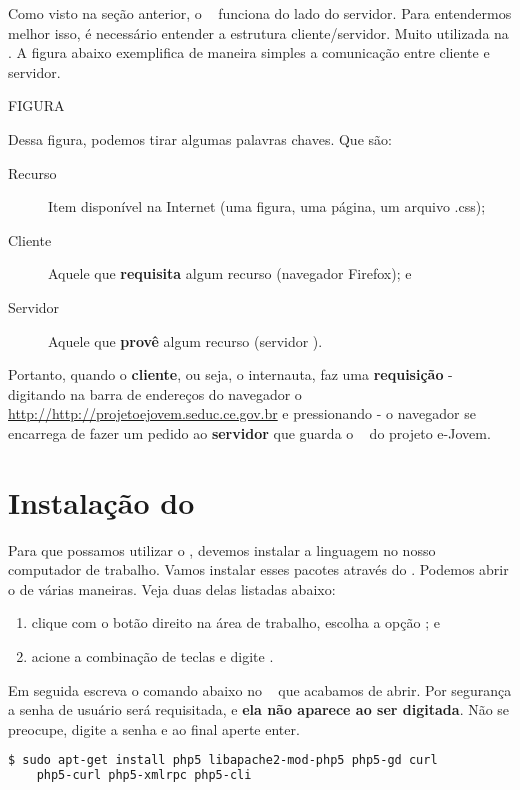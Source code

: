 Como visto na seção anterior, o \php~ funciona do lado do servidor. Para entendermos
melhor isso, é necessário entender a estrutura cliente/servidor. Muito utilizada
na \internet. A figura abaixo exemplifica de maneira simples a comunicação entre
cliente e servidor.

FIGURA

Dessa figura, podemos tirar algumas palavras chaves. Que são:
\begin{description}
  \item [Recurso] Item disponível na Internet (uma figura, uma página, um arquivo .css);
  \item [Cliente] Aquele que \textbf{requisita} algum recurso (navegador Firefox); e
  \item [Servidor] Aquele que \textbf{provê} algum recurso (servidor \apache).
\end{description}

Portanto, quando o \textbf{cliente}, ou seja, o internauta, faz uma \textbf{requisição} 
- digitando na barra de endereços do navegador o \site~ 
\url{http://http://projetoejovem.seduc.ce.gov.br} e pressionando  - o navegador 
se encarrega de fazer um pedido ao \textbf{servidor} que guarda o \site~ do projeto e-Jovem.

\section{Instalação do \php}
\label{instalacao-do-php}

Para que possamos utilizar o \php, devemos instalar a linguagem no nosso computador
de trabalho. Vamos instalar esses pacotes através do \terminal. Podemos abrir o
\terminal de várias maneiras. Veja duas delas listadas abaixo:

\begin{enumerate}
	\item clique com o botão direito na área de trabalho, escolha a opção
	; e
	\item acione a combinação de teclas \altfdois e digite \xfceterminal.
\end{enumerate}

Em seguida escreva o comando abaixo no \terminal~ que acabamos de abrir. Por segurança
a senha de usuário será requisitada, e \textbf{ela não aparece ao ser digitada}.
Não se preocupe, digite a senha e ao final aperte enter. 

\begin{lstlisting}[language=bash,style=codigos]
  $ sudo apt-get install php5 libapache2-mod-php5 php5-gd curl 
  	php5-curl php5-xmlrpc php5-cli
\end{lstlisting}

